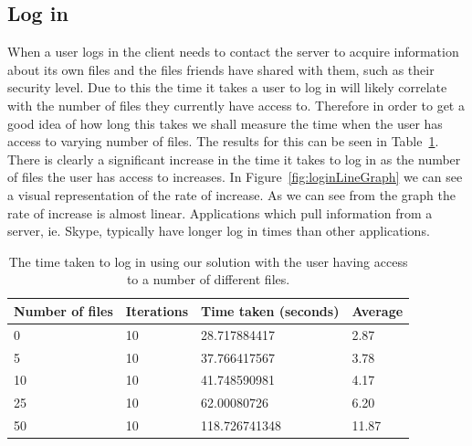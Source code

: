 \documentclass[12pt, titlepage]{article}
\begin{document}
\subsection{Log in}
When a user logs in the client needs to contact the server to acquire information about its own files and the files friends have shared with them, such as their security level. Due to this the time it takes a user to log in will likely correlate with the number of files they currently have access to. Therefore in order to get a good idea of how long this takes we shall measure the time when the user has access to varying number of files. The results for this can be seen in Table~\ref{tab:loginBenchmark}.
\newline \indent There is clearly a significant increase in the time it takes to log in as the number of files the user has access to increases. In Figure~\ref{fig:loginLineGraph} we can see a visual representation of the rate of increase. As we can see from the graph the rate of increase is almost linear.
\newline \indent Applications which pull information from a server, ie. Skype, typically have longer log in times than other applications.



\begin{table}[h]
	\begin{center}
    	\begin{tabular}{ | l | l | l | l |}
    \hline
    \textbf{Number of files} & \textbf{Iterations} & \textbf{Time taken 		(seconds)} & \textbf{Average} \\ \hline
    
    0  & 10 & 28.717884417 & 2.87 \\ \hline
    5  & 10 & 37.766417567 & 3.78 \\ \hline
    10 & 10 & 41.748590981 & 4.17 \\ \hline
    25 & 10 & 62.00080726 & 6.20 \\ \hline
    50 & 10 & 118.726741348 & 11.87 \\ \hline
    
    \end{tabular}
    \caption{The time taken to log in using our solution with the user having access to a number of different files.}
    \label{tab:loginBenchmark}
   \end{center}
\end{table}
    
\end{document}
